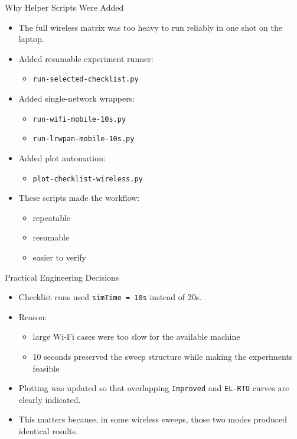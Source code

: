 \documentclass[aspectratio=169]{beamer}
\begin{document}
\begin{frame}{Why Helper Scripts Were Added}
  \begin{itemize}
    \item The full wireless matrix was too heavy to run reliably in one shot on the laptop.
    \item Added resumable experiment runner:
    \begin{itemize}
      \item \texttt{run-selected-checklist.py}
    \end{itemize}
    \item Added single-network wrappers:
    \begin{itemize}
      \item \texttt{run-wifi-mobile-10s.py}
      \item \texttt{run-lrwpan-mobile-10s.py}
    \end{itemize}
    \item Added plot automation:
    \begin{itemize}
      \item \texttt{plot-checklist-wireless.py}
    \end{itemize}
    \item These scripts made the workflow:
    \begin{itemize}
      \item repeatable
      \item resumable
      \item easier to verify
    \end{itemize}
  \end{itemize}
\end{frame}

\begin{frame}{Practical Engineering Decisions}
  \begin{itemize}
    \item Checklist runs used \texttt{simTime = 10s} instead of 20s.
    \item Reason:
    \begin{itemize}
      \item large Wi-Fi cases were too slow for the available machine
      \item 10 seconds preserved the sweep structure while making the experiments feasible
    \end{itemize}
    \item Plotting was updated so that overlapping \texttt{Improved} and \texttt{EL-RTO} curves are clearly indicated.
    \item This matters because, in some wireless sweeps, those two modes produced identical results.
  \end{itemize}
\end{frame}
\end{document}

